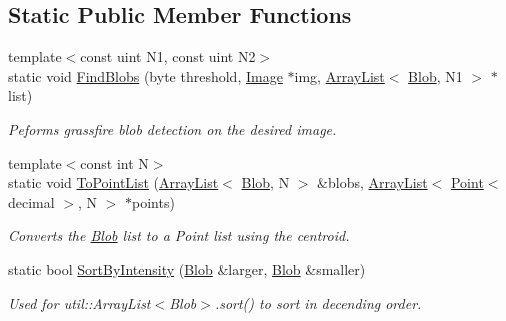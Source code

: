 \subsection*{Static Public Member Functions}
\begin{DoxyCompactItemize}
\item 
{\footnotesize template$<$const uint N1, const uint N2$>$ }\\static void \hyperlink{classimage__processing_1_1Blob_aef3741a23c94dac01e69ccd20455b719}{Find\+Blobs} (byte threshold, \hyperlink{classimage__processing_1_1Image}{Image} $\ast$img, \hyperlink{classutil_1_1ArrayList}{Array\+List}$<$ \hyperlink{classimage__processing_1_1Blob}{Blob}, N1 $>$ $\ast$list)
\begin{DoxyCompactList}\small\item\em Peforms grassfire blob detection on the desired image. \end{DoxyCompactList}\item 
{\footnotesize template$<$const int N$>$ }\\static void \hyperlink{classimage__processing_1_1Blob_af9e1b968ae336b91c42b4574f97477de}{To\+Point\+List} (\hyperlink{classutil_1_1ArrayList}{Array\+List}$<$ \hyperlink{classimage__processing_1_1Blob}{Blob}, N $>$ \&blobs, \hyperlink{classutil_1_1ArrayList}{Array\+List}$<$ \hyperlink{classutil_1_1Point}{Point}$<$ decimal $>$, N $>$ $\ast$points)
\begin{DoxyCompactList}\small\item\em Converts the \hyperlink{classimage__processing_1_1Blob}{Blob} list to a Point list using the centroid. \end{DoxyCompactList}\item 
static bool \hyperlink{classimage__processing_1_1Blob_a79ee4aef000ec123d01bdbb21d6d9054}{Sort\+By\+Intensity} (\hyperlink{classimage__processing_1_1Blob}{Blob} \&larger, \hyperlink{classimage__processing_1_1Blob}{Blob} \&smaller)
\begin{DoxyCompactList}\small\item\em Used for util\+::\+Array\+List$<$\+Blob$>$.\+sort() to sort in decending order. \end{DoxyCompactList}\end{DoxyCompactItemize}
